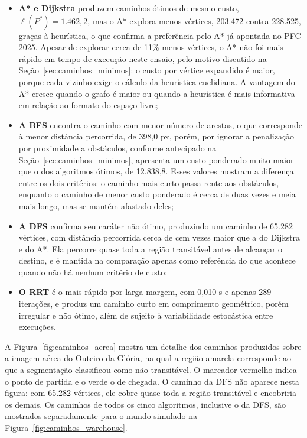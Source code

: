 \documentclass[
    12pt,
    openright,
    oneside,
    a4paper,
    english,
    brazil
]{abntex2}
\begin{document}
\begin{itemize}
    \item \textbf{A* e Dijkstra} produzem caminhos ótimos de mesmo custo, $\ell(P^\ast) = 1.462{,}2$, mas o A* explora menos vértices, 203.472 contra 228.525, graças à heurística, o que confirma a preferência pelo A* já apontada no PFC 2025. Apesar de explorar cerca de 11\% menos vértices, o A* não foi mais rápido em tempo de execução neste ensaio, pelo motivo discutido na Seção~\ref{sec:caminhos_minimos}: o custo por vértice expandido é maior, porque cada vizinho exige o cálculo da heurística euclidiana. A vantagem do A* cresce quando o grafo é maior ou quando a heurística é mais informativa em relação ao formato do espaço livre;
    \item \textbf{A BFS} encontra o caminho com menor número de arestas, o que corresponde à menor distância percorrida, de 398,0 px, porém, por ignorar a penalização por proximidade a obstáculos, conforme antecipado na Seção~\ref{sec:caminhos_minimos}, apresenta um custo ponderado muito maior que o dos algoritmos ótimos, de 12.838,8. Esses valores mostram a diferença entre os dois critérios: o caminho mais curto passa rente aos obstáculos, enquanto o caminho de menor custo ponderado é cerca de duas vezes e meia mais longo, mas se mantém afastado deles;
    \item \textbf{A DFS} confirma seu caráter não ótimo, produzindo um caminho de 65.282 vértices, com distância percorrida cerca de cem vezes maior que a do Dijkstra e do A*. Ela percorre quase toda a região transitável antes de alcançar o destino, e é mantida na comparação apenas como referência do que acontece quando não há nenhum critério de custo;
    \item \textbf{O RRT} é o mais rápido por larga margem, com 0,010 s e apenas 289 iterações, e produz um caminho curto em comprimento geométrico, porém irregular e não ótimo, além de sujeito à variabilidade estocástica entre execuções.
\end{itemize}

A Figura~\ref{fig:caminhos_aerea} mostra um detalhe dos caminhos produzidos sobre a imagem aérea do Outeiro da Glória, na qual a região amarela corresponde ao que a segmentação classificou como não transitável. O marcador vermelho indica o ponto de partida e o verde o de chegada. O caminho da DFS não aparece nesta figura: com 65.282 vértices, ele cobre quase toda a região transitável e encobriria os demais. Os caminhos de todos os cinco algoritmos, inclusive o da DFS, são mostrados separadamente para o mundo simulado na Figura~\ref{fig:caminhos_warehouse}.
\end{document}
